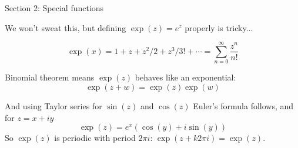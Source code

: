 \documentclass{beamer}
\begin{document}
    \begin{frame}[plain]
     \end{frame}




\begin{frame}{Section 2: Special functions}

We won't sweat this, but defining $\exp(z)=e^z$ properly is tricky...  

\begin{definition}
$$\exp(x)=1+z+z^2/2+z^3/3!+\cdots=\sum_{n=0}^\infty \frac{z^n}{n!}$$
\end{definition}
Binomial theorem means $\exp(z)$ behaves like an exponential: $$\exp(z+w)=\exp(z)\exp(w)$$

And using Taylor series for $\sin(z)$ and $\cos(z)$ Euler's formula follows, and for $z=x+iy$
$$\exp(z)=e^x\left(\cos(y)+i\sin(y)\right)$$
So $\exp(z)$ is periodic with period $2\pi i$: $\exp(z+k2\pi i)=\exp(z)$.

\end{frame}
\end{document}
